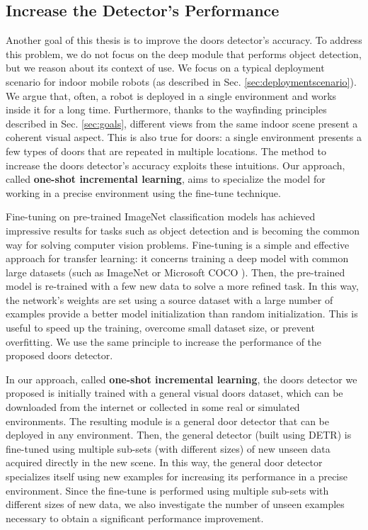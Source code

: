 \subsection{Increase the Detector's Performance} Another goal of this thesis is to improve the doors detector's accuracy. To address this problem, we do not focus on the deep module that performs object detection, but we reason about its context of use. We focus on a typical deployment scenario for indoor mobile robots (as described in Sec. \ref{sec:deploymentscenario}). We argue that, often, a robot is deployed in a single environment and works inside it for a long time. Furthermore, thanks to  the wayfinding principles described in Sec. \ref{sec:goals}, different views from the same indoor scene present a coherent visual aspect. This is also true for doors: a single environment presents a few types of doors that are repeated in multiple locations. The method to increase the doors detector's accuracy exploits these intuitions. Our approach, called \textbf{one-shot incremental learning}, aims to specialize the model for working in a precise environment using the fine-tune technique. 

Fine-tuning on pre-trained ImageNet classification models \cite{verydeepimagenet, resnet} has achieved impressive results for tasks such as object detection \cite{fasterrcnn, yolo, yolov2} and is becoming the common way for solving computer vision problems. Fine-tuning is a simple and effective
approach for transfer learning: it concerns training a deep model with common large datasets (such as ImageNet \cite{imagenet} or Microsoft COCO \cite{coco}). Then, the pre-trained model is re-trained with a few new data to solve a more refined task. In this way, the network's weights are set using a source dataset with a large number of examples provide a better
model initialization than random initialization. This is useful to speed up the training, overcome small dataset size, or prevent overfitting. We use the same principle to increase the performance of the proposed doors detector. 

In our approach, called \textbf{one-shot incremental learning}, the doors detector we proposed is initially trained with a general visual doors dataset, which can be downloaded from the internet or collected in some real or simulated environments. The resulting module is a general door detector that can be deployed in any environment. Then, the general detector (built using DETR) is fine-tuned using multiple sub-sets (with different sizes) of new unseen data acquired directly in the new scene. In this way, the general door detector specializes itself using new examples for increasing its performance in a precise environment. Since the fine-tune is performed using multiple sub-sets with different sizes of new data, we also investigate the number of unseen examples necessary to obtain a significant performance improvement.

